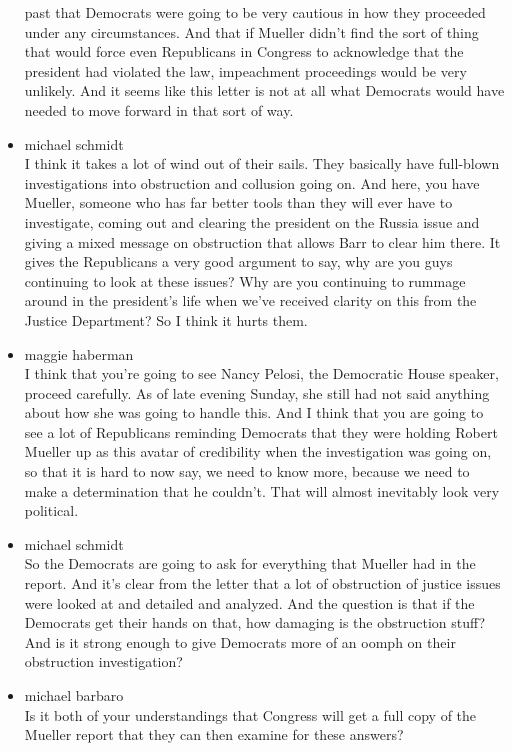 \begin{itemize}
  past that Democrats were going to be very cautious in how they
  proceeded under any circumstances. And that if Mueller didn't find the
  sort of thing that would force even Republicans in Congress to
  acknowledge that the president had violated the law, impeachment
  proceedings would be very unlikely. And it seems like this letter is
  not at all what Democrats would have needed to move forward in that
  sort of way.
\item
  michael schmidt\\
  I think it takes a lot of wind out of their sails. They basically have
  full-blown investigations into obstruction and collusion going on. And
  here, you have Mueller, someone who has far better tools than they
  will ever have to investigate, coming out and clearing the president
  on the Russia issue and giving a mixed message on obstruction that
  allows Barr to clear him there. It gives the Republicans a very good
  argument to say, why are you guys continuing to look at these issues?
  Why are you continuing to rummage around in the president's life when
  we've received clarity on this from the Justice Department? So I think
  it hurts them.
\item
  maggie haberman\\
  I think that you're going to see Nancy Pelosi, the Democratic House
  speaker, proceed carefully. As of late evening Sunday, she still had
  not said anything about how she was going to handle this. And I think
  that you are going to see a lot of Republicans reminding Democrats
  that they were holding Robert Mueller up as this avatar of credibility
  when the investigation was going on, so that it is hard to now say, we
  need to know more, because we need to make a determination that he
  couldn't. That will almost inevitably look very political.
\item
  michael schmidt\\
  So the Democrats are going to ask for everything that Mueller had in
  the report. And it's clear from the letter that a lot of obstruction
  of justice issues were looked at and detailed and analyzed. And the
  question is that if the Democrats get their hands on that, how
  damaging is the obstruction stuff? And is it strong enough to give
  Democrats more of an oomph on their obstruction investigation?
\item
  michael barbaro\\
  Is it both of your understandings that Congress will get a full copy
  of the Mueller report that they can then examine for these answers?

\end{itemize}
